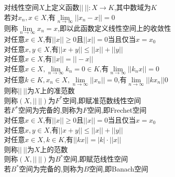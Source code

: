 \begin{dingyi}
对线性空间$X$上定义函数$||\ ||:X\to K$,其中数域为$K$\\
若对$x_n,x\in X$,有$\lim\limits_{n\to\infty}||x_n-x||=0$\\
则称$\lim\limits_{n\to\infty}x_n=x$,即以此函数定义线性空间上的收敛性\\
对任意$x\in X$,有$||x||\geq 0$且$||x||=0$当且仅当$x=x_0$\\
对任意$x,y\in X$,有$||x+y||\leq ||x||+||y||$\\
对任意$x\in X$,有$||x||=||-x||$\\
对任意$x\in X,\lim\limits_{n\to\infty}k_n=0\in K$,有$\lim\limits_{n\to\infty}||k_nx||=0$\\
对任意$k\in K,x_n\in X,\lim\limits_{n\to\infty}||x_n||=0$,有$\lim\limits_{n\to\infty}||kx_n||0$\\
则称$||\ ||$为$X$上的准范数\\
则称$(X,||\ ||)$为$F^*$空间,即赋准范数线性空间\\
若$F^*$空间为完备的,则称为$F$空间,即Frechet空间\\
对任意$x\in X$,有$||x||\geq 0$且$||x||=0$当且仅当$x=x_0$\\
对任意$x,y\in X$,有$||x+y||\leq ||x||+||y||$\\
对任意$x\in X,k\in K$,有$||kx||=|k|\cdot||x||$\\
则称$||\ ||$为$X$上的范数\\
则称$(X,||\ ||)$为$B^*$空间,即赋范线性空间\\
若$B^*$空间为完备的,则称为$B$空间,即Banach空间
\end{dingyi}

